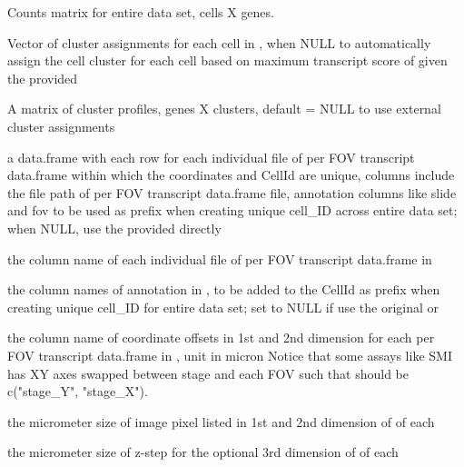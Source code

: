 \documentclass[letterpaper]{book}
\begin{document}
%
\begin{Arguments}
\begin{ldescription}
\item[\code{counts}] Counts matrix for entire data set, cells X genes.

\item[\code{clust}] Vector of cluster assignments for each cell in , when NULL to automatically assign the cell cluster for each cell based on maximum transcript score of given the provided 

\item[\code{refProfiles}] A matrix of cluster profiles, genes X clusters, default = NULL to use external cluster assignments

\item[\code{transDF\_fileInfo}] a data.frame with each row for each individual file of per FOV transcript data.frame within which the coordinates and CellId are unique, columns include the file path of per FOV transcript data.frame file, annotation columns like slide and fov to be used as prefix when creating unique cell\_ID across entire data set; when NULL, use the provided  directly

\item[\code{filepath\_coln}] the column name of each individual file of per FOV transcript data.frame in 

\item[\code{prefix\_colns}] the column names of annotation in , to be added to the CellId as prefix when creating unique cell\_ID for entire data set; set to NULL if use the original  or 

\item[\code{fovOffset\_colns}] the column name of coordinate offsets in 1st and 2nd dimension for each per FOV transcript data.frame in , unit in micron
Notice that some assays like SMI has XY axes swapped between stage and each FOV such that  should be c("stage\_Y", "stage\_X").

\item[\code{pixel\_size}] the micrometer size of image pixel listed in 1st and 2nd dimension of  of each 

\item[\code{zstep\_size}] the micrometer size of z-step for the optional 3rd dimension of  of each 


\end{ldescription}
\end{Arguments}
\end{document}
